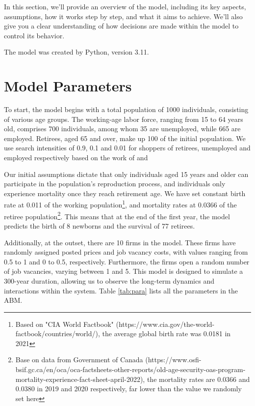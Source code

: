 \documentclass[ %
    final,
    scrbook,
    listoffigures,
    listoftables, 
    glossary]{cu-thesis}
\begin{document}
In this section, we'll provide an overview of the model, including its key aspects, assumptions, how it works step by step, and what it aims to achieve. We'll also give you a clear understanding of how decisions are made within the model to control its behavior.

The model was created by Python, version 3.11.
\fi

\section{Model Parameters}
To start, the model begins with a total population of 1000 individuals, consisting of various age groups. The working-age labor force, ranging from 15 to 64 years old, comprises 700 individuals, among whom 35 are unemployed, while 665 are employed. Retirees, aged 65 and over, make up 100 of the initial population. We use search intensities of 0.9, 0.1 and 0.01 for shoppers of retirees, unemployed and employed respectively based on the work of \cite{krueger2010job} and \cite{kaplan2016shopping}

Our initial assumptions dictate that only individuals aged 15 years and older can participate in the population's reproduction process, and individuals only experience mortality once they reach retirement age. We have set constant birth rate at 0.011 of the working population\footnote{Based on "CIA World Factbook"  (https://www.cia.gov/the-world-factbook/countries/world/), the average global birth rate was 0.0181 in 2021}, and mortality rates at 0.0366 of the retiree population\footnote{Base on data from Government of Canada (https://www.osfi-bsif.gc.ca/en/oca/oca-factsheets-other-reports/old-age-security-oas-program-mortality-experience-fact-sheet-april-2022), the mortality rates are 0.0366 and 0.0380 in 2019 and 2020 respectively, far lower than the value we randomly set here}. This means that at the end of the first year, the model predicts the birth of 8 newborns and the survival of 77 retirees.

Additionally, at the outset, there are 10 firms in the model. These firms have randomly assigned posted prices and job vacancy costs, with values ranging from 0.5 to 1 and 0 to 0.5, respectively. Furthermore, the firms open a random number of job vacancies, varying between 1 and 5. This model is designed to simulate a 300-year duration, allowing us to observe the long-term dynamics and interactions within the system. Table \ref{tab:para} lists all the parameters in the ABM.
\end{document}
